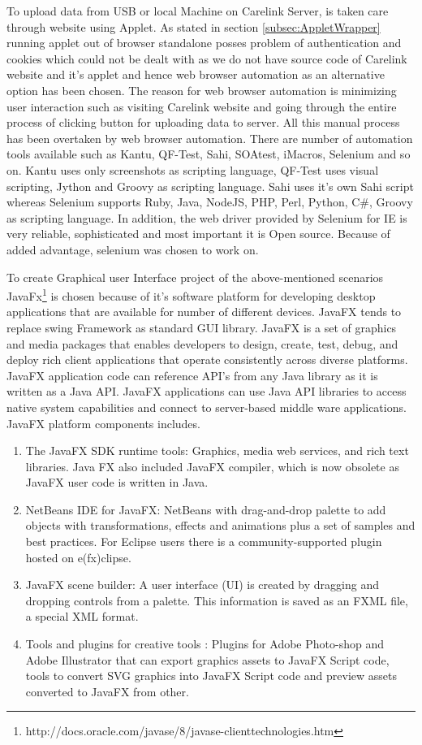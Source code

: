 \documentclass[article,type=msc,colorback,accentcolor=tud9c,twoside,11pt]{tudthesis}
\begin{document}
To upload data from USB or local Machine on Carelink Server, is taken care through website using Applet. As stated in section \ref{subsec:AppletWrapper} running applet out of browser standalone posses problem of authentication and cookies which could not be dealt with as we do not have source code of Carelink website and it's applet and hence web browser automation as an alternative option has been chosen. The reason for web browser automation is minimizing user interaction such as visiting Carelink website and going through the entire process of clicking button for uploading data to server. All this manual process has been overtaken by web browser automation. There are number of automation tools available such as Kantu, QF-Test, Sahi, SOAtest, iMacros, Selenium and so on. Kantu uses only screenshots as scripting language, QF-Test uses visual scripting, Jython and Groovy as scripting language. Sahi uses it's own Sahi script whereas Selenium supports Ruby, Java, NodeJS, PHP, Perl, Python, C\#, Groovy as scripting language. In addition, the web driver provided by Selenium for IE is very reliable, sophisticated and most important it is Open source. Because of added advantage, selenium was chosen to work on.

To create Graphical user Interface project of the above-mentioned scenarios JavaFx\footnote{http://docs.oracle.com/javase/8/javase-clienttechnologies.htm} is chosen because of it's software platform for developing desktop applications that are available for number of different devices. JavaFX tends to replace swing Framework as standard GUI library. JavaFX is a set of graphics and media packages that enables developers to design, create, test, debug, and deploy rich client applications that operate consistently across diverse platforms. JavaFX application code can reference API's from any Java library as it is written as a Java API. JavaFX applications can use Java API libraries to access native system capabilities and connect to server-based middle ware applications. JavaFX platform components includes.
\begin{enumerate}
\item The JavaFX SDK runtime tools: Graphics, media web services, and rich text libraries. Java FX  also included JavaFX compiler, which is now obsolete as JavaFX user code is written in Java.
\item NetBeans IDE for JavaFX: NetBeans with drag-and-drop palette to add objects with transformations, effects and animations plus a set of samples and best practices. For Eclipse users there is a community-supported plugin hosted on e(fx)clipse.
\item JavaFX scene builder: A user interface (UI) is created by dragging and dropping controls from a palette. This information is saved as an FXML file, a special XML format.
\item Tools and plugins for creative tools : Plugins for Adobe Photo-shop and Adobe Illustrator that can export graphics assets to JavaFX Script code, tools to convert SVG graphics into JavaFX Script code and preview assets converted to JavaFX from other.
\end{enumerate}
\end{document}
